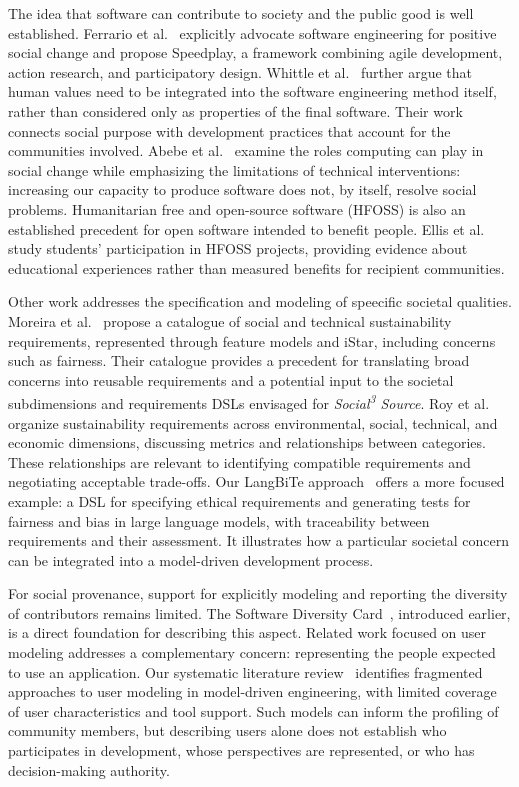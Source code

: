 \documentclass[11pt,a4paper]{article}
\newcommand{\socialsource}{\texorpdfstring{\textit{Social\textsuperscript{3} Source}}{Social3 Source}}
\begin{document}
The idea that software can contribute to society and the public good is well established.
Ferrario et al.~\cite{Ferrario2014SocialGood} explicitly advocate software engineering for positive social change and propose Speedplay, a framework combining agile development, action research, and participatory design.
Whittle et al.~\cite{Whittle2021HumanValues} further argue that human values need to be integrated into the software engineering method itself, rather than considered only as properties of the final software.
Their work connects social purpose with development practices that account for the communities involved.
Abebe et al.~\cite{Abebe2020SocialChange} examine the roles computing can play in social change while emphasizing the limitations of technical interventions: increasing our capacity to produce software does not, by itself, resolve social problems.
Humanitarian free and open-source software (HFOSS) is also an established precedent for open software intended to benefit people.
Ellis et al.~\cite{Ellis2015HFOSS} study students' participation in HFOSS projects, providing evidence about educational experiences rather than measured benefits for recipient communities.

Other work addresses the specification and modeling of speecific societal qualities.
Moreira et al.~\cite{Moreira2023Sustainability} propose a catalogue of social and technical sustainability requirements, represented through feature models and iStar, including concerns such as fairness.
Their catalogue provides a precedent for translating broad concerns into reusable requirements and a potential input to the societal subdimensions and requirements DSLs envisaged for \socialsource{}.
Roy et al.~\cite{Roy2026Taxonomy} organize sustainability requirements across environmental, social, technical, and economic dimensions, discussing metrics and relationships between categories. 
These relationships are relevant to identifying compatible requirements and negotiating acceptable trade-offs.
Our LangBiTe approach~\cite{Morales2024LangBiTe} offers a more focused example: a DSL for specifying ethical requirements and generating tests for fairness and bias in large language models, with traceability between requirements and their assessment.
It illustrates how a particular societal concern can be integrated into a model-driven development process.

For social provenance, support for explicitly modeling and reporting the diversity of contributors remains limited.
The Software Diversity Card~\cite{R2}, introduced earlier, is a direct foundation for describing this aspect.
Related work focused on user modeling addresses a complementary concern: representing the people expected to use an application.
Our systematic literature review~\cite{Conrardy2025UserModeling} identifies fragmented approaches to user modeling in model-driven engineering, with limited coverage of user characteristics and tool support.
Such models can inform the profiling of community members, but describing users alone does not establish who participates in development, whose perspectives are represented, or who has decision-making authority.
\end{document}
